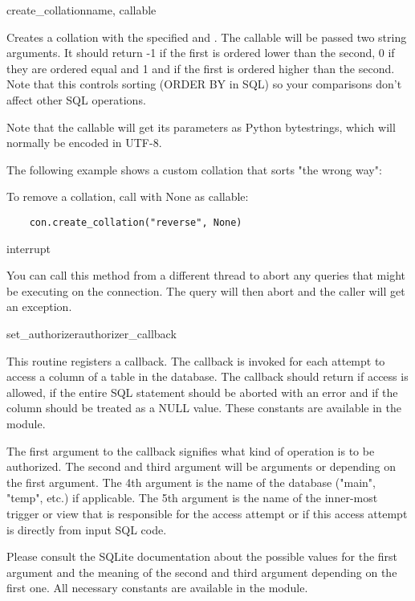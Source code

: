 \begin{methoddesc}{create_collation}{name, callable}

Creates a collation with the specified  and . The
callable will be passed two string arguments. It should return -1 if the first
is ordered lower than the second, 0 if they are ordered equal and 1 and if the
first is ordered higher than the second.  Note that this controls sorting
(ORDER BY in SQL) so your comparisons don't affect other SQL operations.

Note that the callable will get its parameters as Python bytestrings, which
will normally be encoded in UTF-8.

The following example shows a custom collation that sorts "the wrong way":

  

To remove a collation, call  with None as callable:

\begin{verbatim}
    con.create_collation("reverse", None)
\end{verbatim}
\end{methoddesc}

\begin{methoddesc}{interrupt}{}

You can call this method from a different thread to abort any queries that
might be executing on the connection. The query will then abort and the caller
will get an exception.
\end{methoddesc}

\begin{methoddesc}{set_authorizer}{authorizer_callback}

This routine registers a callback. The callback is invoked for each attempt to
access a column of a table in the database. The callback should return
 if access is allowed,  if the entire
SQL statement should be aborted with an error and  if
the column should be treated as a NULL value. These constants are available in
the  module.

The first argument to the callback signifies what kind of operation is to be
authorized. The second and third argument will be arguments or 
depending on the first argument. The 4th argument is the name of the database
("main", "temp", etc.) if applicable. The 5th argument is the name of the
inner-most trigger or view that is responsible for the access attempt or
 if this access attempt is directly from input SQL code.

Please consult the SQLite documentation about the possible values for the first
argument and the meaning of the second and third argument depending on the
first one. All necessary constants are available in the 
module.
\end{methoddesc}

